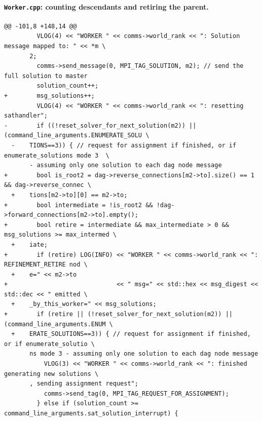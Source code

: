 \documentclass[11pt,a4paper]{article}
\begin{document}
\paragraph{\texttt{Worker.cpp}: counting descendants and retiring the parent.}
{\scriptsize\begin{verbatim}
@@ -101,8 +148,14 @@
         VLOG(4) << "WORKER " << comms->world_rank << ": Solution message mapped to: " << *m \
       2;
         comms->send_message(0, MPI_TAG_SOLUTION, m2); // send the full solution to master
         solution_count++;
+        msg_solutions++;
         VLOG(4) << "WORKER " << comms->world_rank << ": resetting sathandler";
-        if ((!reset_solver_for_next_solution(m2)) || (command_line_arguments.ENUMERATE_SOLU \
  -    TIONS==3)) { // request for assignment if finished, or if enumerate_solutions mode 3  \
       - assuming only one solution to each dag node message
+        bool is_root2 = dag->reverse_connections[m2->to].size() == 1 && dag->reverse_connec \
  +    tions[m2->to][0] == m2->to;
+        bool intermediate = !is_root2 && !dag->forward_connections[m2->to].empty();
+        bool retire = intermediate && max_intermediate > 0 && msg_solutions >= max_intermed \
  +    iate;
+        if (retire) LOG(INFO) << "WORKER " << comms->world_rank << ": REFINEMENT_RETIRE nod \
  +    e=" << m2->to
+                              << " msg=" << std::hex << msg_digest << std::dec << " emitted \
  +    _by_this_worker=" << msg_solutions;
+        if (retire || (!reset_solver_for_next_solution(m2)) || (command_line_arguments.ENUM \
  +    ERATE_SOLUTIONS==3)) { // request for assignment if finished, or if enumerate_solutio \
       ns mode 3 - assuming only one solution to each dag node message
           VLOG(3) << "WORKER " << comms->world_rank << ": finished generating new solutions \
       , sending assignment request";
           comms->send_tag(0, MPI_TAG_REQUEST_FOR_ASSIGNMENT);
         } else if (solution_count >= command_line_arguments.sat_solution_interrupt) {
\end{verbatim}}
\end{document}
